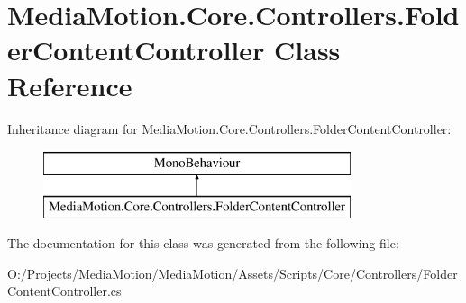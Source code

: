 \hypertarget{class_media_motion_1_1_core_1_1_controllers_1_1_folder_content_controller}{\section{Media\+Motion.\+Core.\+Controllers.\+Folder\+Content\+Controller Class Reference}
\label{class_media_motion_1_1_core_1_1_controllers_1_1_folder_content_controller}
}
Inheritance diagram for Media\+Motion.\+Core.\+Controllers.\+Folder\+Content\+Controller\+:\begin{figure}[H]
\begin{center}
\leavevmode
\includegraphics[height=2.000000cm]{class_media_motion_1_1_core_1_1_controllers_1_1_folder_content_controller}
\end{center}
\end{figure}


The documentation for this class was generated from the following file\+:\begin{DoxyCompactItemize}
\item 
O\+:/\+Projects/\+Media\+Motion/\+Media\+Motion/\+Assets/\+Scripts/\+Core/\+Controllers/Folder\+Content\+Controller.\+cs\end{DoxyCompactItemize}

